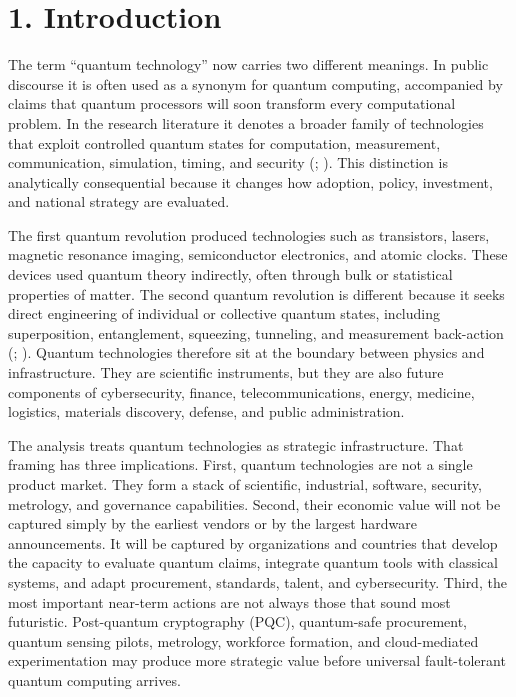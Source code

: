 \documentclass[
  11pt,
  letterpaper,
]{article}
\begin{document}
\section{1. Introduction}\label{introduction}

The term ``quantum technology'' now carries two different meanings. In
public discourse it is often used as a synonym for quantum computing,
accompanied by claims that quantum processors will soon transform every
computational problem. In the research literature it denotes a broader
family of technologies that exploit controlled quantum states for
computation, measurement, communication, simulation, timing, and
security (;
). This distinction is
analytically consequential because it changes how adoption, policy,
investment, and national strategy are evaluated.

The first quantum revolution produced technologies such as transistors,
lasers, magnetic resonance imaging, semiconductor electronics, and
atomic clocks. These devices used quantum theory indirectly, often
through bulk or statistical properties of matter. The second quantum
revolution is different because it seeks direct engineering of
individual or collective quantum states, including superposition,
entanglement, squeezing, tunneling, and measurement back-action
(;
).
Quantum technologies therefore sit at the boundary between physics and
infrastructure. They are scientific instruments, but they are also
future components of cybersecurity, finance, telecommunications, energy,
medicine, logistics, materials discovery, defense, and public
administration.

The analysis treats quantum technologies as strategic infrastructure.
That framing has three implications. First, quantum technologies are not
a single product market. They form a stack of scientific, industrial,
software, security, metrology, and governance capabilities. Second,
their economic value will not be captured simply by the earliest vendors
or by the largest hardware announcements. It will be captured by
organizations and countries that develop the capacity to evaluate
quantum claims, integrate quantum tools with classical systems, and
adapt procurement, standards, talent, and cybersecurity. Third, the most
important near-term actions are not always those that sound most
futuristic. Post-quantum cryptography (PQC), quantum-safe procurement,
quantum sensing pilots, metrology, workforce formation, and
cloud-mediated experimentation may produce more strategic value before
universal fault-tolerant quantum computing arrives.
\end{document}
